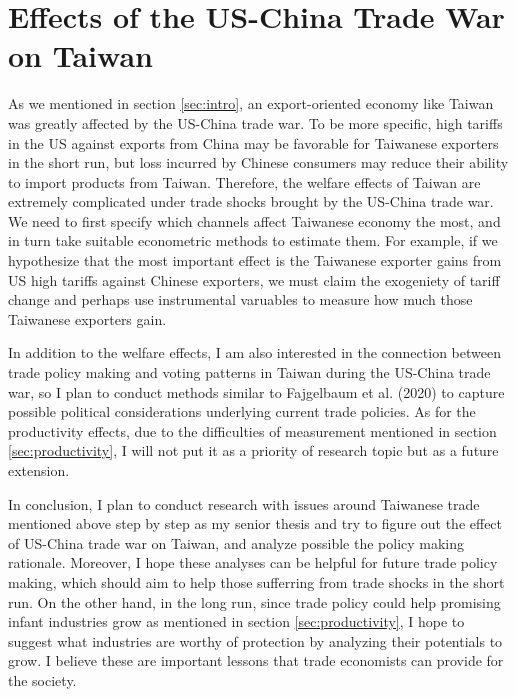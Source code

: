 \documentclass[12pt]{article}
\begin{document}
\section{Effects of the US-China Trade War on Taiwan}
\label{sec:Taiwan}
As we mentioned in section \ref{sec:intro}, an export-oriented economy like Taiwan was greatly affected by the US-China trade war.
To be more specific, high tariffs in the US against exports from China may be favorable for Taiwanese exporters in the short run, 
but loss incurred by Chinese consumers may reduce their ability to import products from Taiwan.
Therefore, the welfare effects of Taiwan are extremely complicated under trade shocks brought by the US-China trade war.
We need to first specify which channels affect Taiwanese economy the most, and in turn take suitable econometric methods to estimate them.
For example, if we hypothesize that the most important effect is the Taiwanese exporter gains from US high tariffs against Chinese exporters, 
we must claim the exogeniety of tariff change and perhaps use instrumental varuables to measure how much those Taiwanese exporters gain. 

In addition to the welfare effects, I am also interested in the connection between trade policy making and voting patterns in Taiwan during the US-China trade war, 
so I plan to conduct methods similar to Fajgelbaum et al. (2020) \cite{fajgelbaum2020return} to capture possible political considerations underlying current trade policies.
As for the productivity effects, due to the difficulties of measurement mentioned in section \ref{sec:productivity}, I will not put it as a priority of research topic but as a future extension. 

In conclusion, I plan to conduct research with issues around Taiwanese trade mentioned above step by step as my senior thesis and try to figure out the effect of US-China trade war on Taiwan, 
and analyze possible the policy making rationale. 
Moreover, I hope these analyses can be helpful for future trade policy making, which should aim to help those sufferring from trade shocks in the short run.
On the other hand, in the long run, since trade policy could help promising infant industries grow as mentioned in section \ref{sec:productivity}, 
I hope to suggest what industries are worthy of protection by analyzing their potentials to grow. 
I believe these are important lessons that trade economists can provide for the society.




\end{document}
